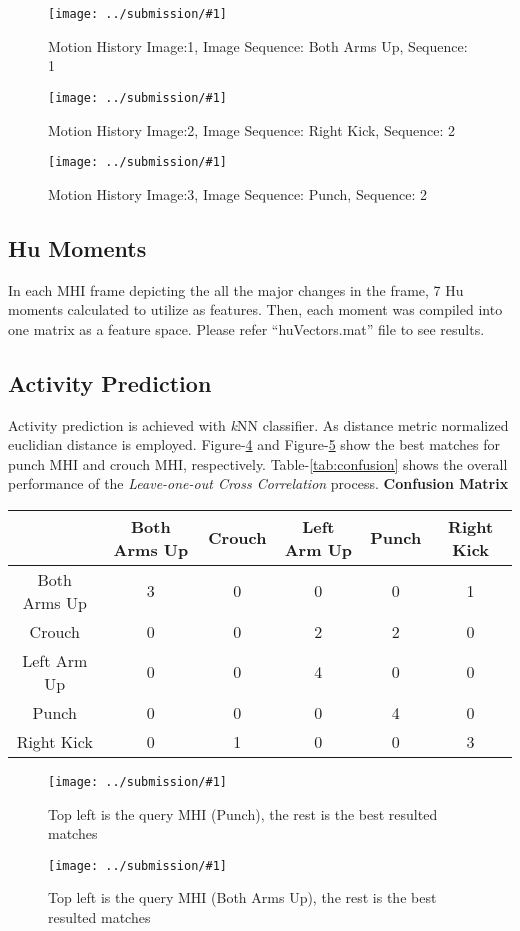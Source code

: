 \documentclass{article}
\newcommand{\listFigure}[3]{ \begin{figure}[H]
\texttt{[image: ../submission/\#1]}
		\caption{#2\label{fig:#3}} 
	\end{figure}		
}
\begin{document}
\listFigure{MHI-botharms-p1-1.png}{Motion History Image:1, Image Sequence:
Both Arms Up, Sequence:
1}{MHI-botharms-p1-1} 

\listFigure{MHI-rightkick-p1-2.png}{Motion History Image:2, Image Sequence:
Right Kick, Sequence:
2}{MHI-rightkick-p1-2} 

\listFigure{MHI-punch-p1-2.png}{Motion History Image:3, Image Sequence:
Punch, Sequence:
2}{MHI-punch-p1-2.png} 
\subsection{Hu Moments}
In each MHI frame depicting the all the major changes in the frame, 7 Hu moments
calculated to utilize as features. Then, each moment was compiled into one
matrix as a feature space. Please refer ``huVectors.mat'' file to see results.
\subsection{Activity Prediction}
Activity prediction is achieved with \textit{k}NN classifier. As distance
metric normalized euclidian distance is employed.
Figure-\ref{fig:matched-13-15punch-p2-1-k-3} and
Figure-\ref{fig:matched-2-3botharms-p2-1-k-3} show the best matches for punch
MHI and crouch MHI, respectively.
Table-\ref{tab:confusion} shows the overall performance of the
\textit{Leave-one-out Cross Correlation} process.
\newpage
\textbf{Confusion Matrix}
\begin{center}\label{tab:confusion}
	\begin{tabular}{ |c | c | c | c | c | c| }
	\hline
	  & Both Arms Up & Crouch & Left Arm Up & Punch & Right Kick \\ \hline
	  Both Arms Up & 3 & 0 & 0 & 0 & 1 \\ \hline
	  Crouch & 0 & 0 & 2 & 2 & 0 \\ \hline
	  Left Arm Up & 0 & 0 & 4 & 0 & 0 \\ \hline
	  Punch & 0 & 0 & 0 & 4 & 0 \\ \hline
	  Right Kick & 0 & 1 & 0 & 0 & 3 \\
	\hline
	\end{tabular}
\end{center}
\listFigure{matched-13-15punch-p2-1-k-3.png}{Top
left is the query MHI (Punch), the rest is the best
resulted matches}{matched-13-15punch-p2-1-k-3}
\listFigure{matched-2-3botharms-p2-1-k-3.png}{Top
left is the query MHI (Both Arms Up), the rest is the best
resulted matches}{matched-2-3botharms-p2-1-k-3}
\end{document}

